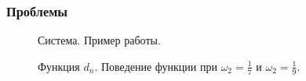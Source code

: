 \documentclass[pdf, 9pt,intlimits, unicode]{beamer}
\begin{document}
	\begin{frame}
		\frametitle{Проблемы}
		\begin{figure}[!hhh]
			\caption{Система. Пример работы.}
		\end{figure}
		\begin{figure}[!hhh]
			\caption{Функция $ d_n $. Поведение функции при $ \omega_2 = \frac{1}{7} $ и $ \omega_2 = \frac{1}{9} $.}
			\label{pic:diff_moment_growth_most_unique}
		\end{figure}
	\end{frame}	
	
\end{document}
